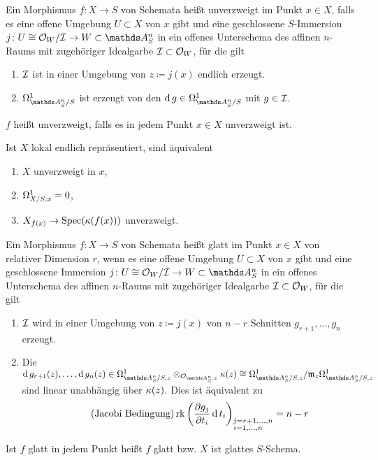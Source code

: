 \documentclass[german]{scrreprt}
\begin{document}
\begin{Definition}[$S$-Modell]
\begin{Definition}
  Ein Morphismus $f\colon X\to S$ von Schemata heißt unverzweigt im
  Punkt $x\in X$, falls es eine offene Umgebung
  $U\subset X$ von $x$ gibt und eine geschlossene $S$-Immersion
  $j\colon U\cong\O_W/\I\to W\subset\A_S^n$ in ein offenes Unterschema
  des affinen $n$-Raums mit zugehöriger Idealgarbe $\mathcal{I}\subset\mathcal{O}_W$,
  für die gilt
  \begin{enumerate}[label=(\alph*)]
  \item $\mathcal{I}$ ist in einer Umgebung von $z\coloneqq j(x)$ endlich erzeugt.
  \item $\Om{\A_S^n/S}$ ist erzeugt von den $\d g\in\Om{\A_S^n/S}$
    mit $g\in\mathcal{I}$.
  \end{enumerate}
  $f$ heißt unverzweigt, falls es in jedem Punkt $x\in X$
  unverzweigt ist.
  \begin{Bemerkung}
    Ist $X$ lokal endlich repräsentiert, sind äquivalent
    \begin{enumerate}[label=(\roman*)]
    \item $X$ unverzweigt in $x$,
    \item $\Omega_{X/S,x}^1=0$,
    \item $X_{f(x)}\to \operatorname{Spec}(\kappa(f(x)))$ unverzweigt.
    \end{enumerate}
    \cite[siehe][8.4, Theorem 3]{bosch}
  \end{Bemerkung}
\end{Definition}

\begin{Definition}
  Ein Morphismus $f\colon X\to S$ von Schemata heißt glatt im Punkt
  $x\in X$ von relativer Dimension $r$, wenn es eine offene Umgebung
  $U\subset X$ von $x$ gibt und eine geschlossene Immersion $j\colon
  U\cong\O_W/\I\to W\subset\A_S^n$ in ein offenes Unterschema des affinen
  $n$-Raums mit zugehöriger Idealgarbe $\mathcal{I}\subset\mathcal{O}_W$, für die
  gilt
  \begin{enumerate}[label=(\alph*)]
  \item $\mathcal{I}$ wird in einer Umgebung von $z\coloneqq j(x)$ von $n-r$ Schnitten
    $g_{r+1},\dotsc,g_{n}$ erzeugt.
  \item Die $\d g_{r+1}(z),\dotsc,\d g_{n}(z)\in 
    \Om{\A_S^n/S,z} \otimes_{\O_{\A_S^n,z}} \k(z)
    \cong \Om{\A_S^n/S,z}/\m_z\Om{\A_S^n/S,z}$ 
    sind linear unabhängig über $\kappa(z)$.
    Dies ist äquivalent zu
    \begin{gather*}\tag{Jacobi Bedingung}
      \operatorname{rk}\left(
        \frac{\partial g_j}{\partial t_i}\operatorname{d} t_i 
      \right)_{\substack{j=r+1,\dotsc,n\\i=1,\dotsc,n\phantom{+1}}}
      = n-r
    \end{gather*}
  \end{enumerate}
  Ist $f$ glatt in jedem Punkt heißt $f$ glatt bzw. $X$ ist glattes
  $S$-Schema.  
  \cite[siehe][8.5, Definition 1]{bosch}


\end{Definition}
\end{Definition}
\end{document}
